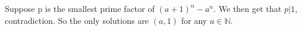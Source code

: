 Suppose p is the smallest prime factor of $(a+1)^n-a^n$. We then get that $p|1$, contradiction.
So the only solutions are $(a,1)$ for any $a\in\mathbb{N}$.
